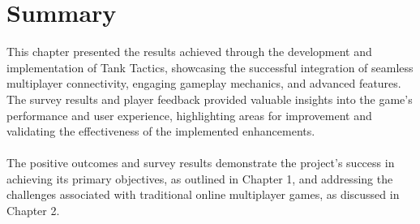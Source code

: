\section{Summary}
This chapter presented the results achieved through the development and implementation of Tank Tactics, showcasing the successful integration of seamless multiplayer connectivity, engaging gameplay mechanics, and advanced features. The survey results and player feedback provided valuable insights into the game's performance and user experience, highlighting areas for improvement and validating the effectiveness of the implemented enhancements.
\\
\noindent
\\
The positive outcomes and survey results demonstrate the project's success in achieving its primary objectives, as outlined in Chapter 1, and addressing the challenges associated with traditional online multiplayer games, as discussed in Chapter 2.



